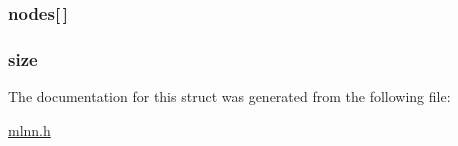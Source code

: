 \subsubsection[{nodes}]{ nodes\mbox{[}$\,$\mbox{]}}\label{struct_column_a90b8ac6daed74219624bcb8b60c2eae6}
\hypertarget{struct_column_aab34baa6cb3e7bebfb7f4ba88a0ffbda}{}
\subsubsection[{size}]{ size}\label{struct_column_aab34baa6cb3e7bebfb7f4ba88a0ffbda}


The documentation for this struct was generated from the following file\+:\begin{DoxyCompactItemize}
\item 
\hyperlink{mlnn_8h}{mlnn.\+h}\end{DoxyCompactItemize}
